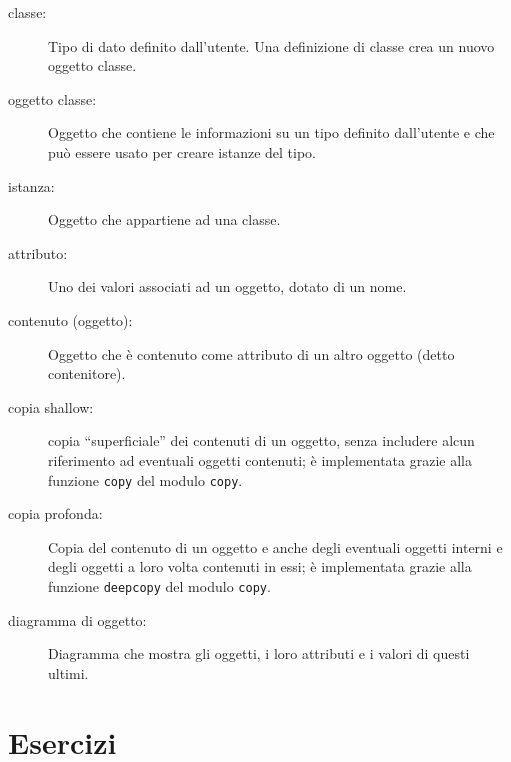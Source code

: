 \documentclass[10pt]{book}
\begin{document}
\begin{description}

\item[classe:] Tipo di dato definito dall'utente. Una definizione di classe crea un nuovo oggetto classe.

\item[oggetto classe:] Oggetto che contiene le informazioni su un tipo definito dall'utente e che può essere usato per creare istanze del tipo.

\item[istanza:] Oggetto che appartiene ad una classe.

\item[attributo:] Uno dei valori associati ad un oggetto, dotato di un nome.

\item[contenuto (oggetto):] Oggetto che è contenuto come attributo di un altro oggetto (detto contenitore).

\item[copia shallow:] copia ``superficiale'' dei contenuti di un oggetto, senza includere alcun riferimento ad eventuali oggetti contenuti; è implementata grazie alla funzione {\tt copy} del modulo {\tt copy}.

\item[copia profonda:] Copia del contenuto di un oggetto e anche degli eventuali
oggetti interni e degli oggetti a loro volta contenuti in essi; è implementata grazie alla funzione {\tt deepcopy} del modulo {\tt copy}.

\item[diagramma di oggetto:] Diagramma che mostra gli oggetti, i loro attributi e i valori di questi ultimi.

\end{description}


\section{Esercizi}
\end{document}
